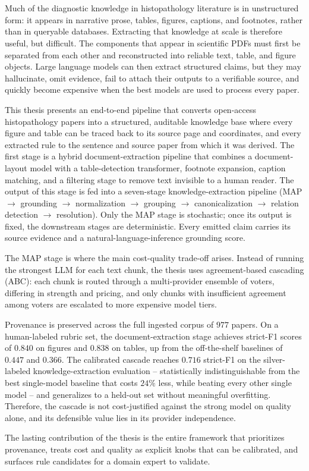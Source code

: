 \chapter{\abstractname}

Much of the diagnostic knowledge in histopathology literature is in unstructured form: it appears in narrative prose, tables, figures, captions, and footnotes, rather than in queryable databases. Extracting that knowledge at scale is therefore useful, but difficult. The components that appear in scientific PDFs must first be separated from each other and reconstructed into reliable text, table, and figure objects. Large language models can then extract structured claims, but they may hallucinate, omit evidence, fail to attach their outputs to a verifiable source, and quickly become expensive when the best models are used to process every paper.

This thesis presents an end-to-end pipeline that converts open-access histopathology papers into a structured, auditable knowledge base where every figure and table can be traced back to its source page and coordinates, and every extracted rule to the sentence and source paper from which it was derived. The first stage is a hybrid document-extraction pipeline that combines a document-layout model with a table-detection transformer, footnote expansion, caption matching, and a filtering stage to remove text invisible to a human reader. The output of this stage is fed into a seven-stage knowledge-extraction pipeline (MAP $\rightarrow$ grounding $\rightarrow$ normalization $\rightarrow$ grouping $\rightarrow$ canonicalization $\rightarrow$ relation detection $\rightarrow$ resolution). Only the MAP stage is stochastic; once its output is fixed, the downstream stages are deterministic. Every emitted claim carries its source evidence and a natural-language-inference grounding score.

The MAP stage is where the main cost-quality trade-off arises. Instead of running the strongest LLM for each text chunk, the thesis uses agreement-based cascading (ABC): each chunk is routed through a multi-provider ensemble of voters, differing in strength and pricing, and only chunks with insufficient agreement among voters are escalated to more expensive model tiers. 

Provenance is preserved across the full ingested corpus of $977$ papers. On a human-labeled rubric set, the document-extraction stage achieves strict-F1 scores of $0.840$ on figures and $0.838$ on tables, up from the off-the-shelf baselines of $0.447$ and $0.366$. The calibrated cascade reaches $0.716$ strict-F1 on the silver-labeled knowledge-extraction evaluation -- statistically indistinguishable from the best single-model baseline that costs $24\%$ less, while beating every other single model -- and generalizes to a held-out set without meaningful overfitting. Therefore, the cascade is not cost-justified against the strong model on quality alone, and its defensible value lies in its provider independence.

The lasting contribution of the thesis is the entire framework that prioritizes provenance, treats cost and quality as explicit knobs that can be calibrated, and surfaces rule candidates for a domain expert to validate.